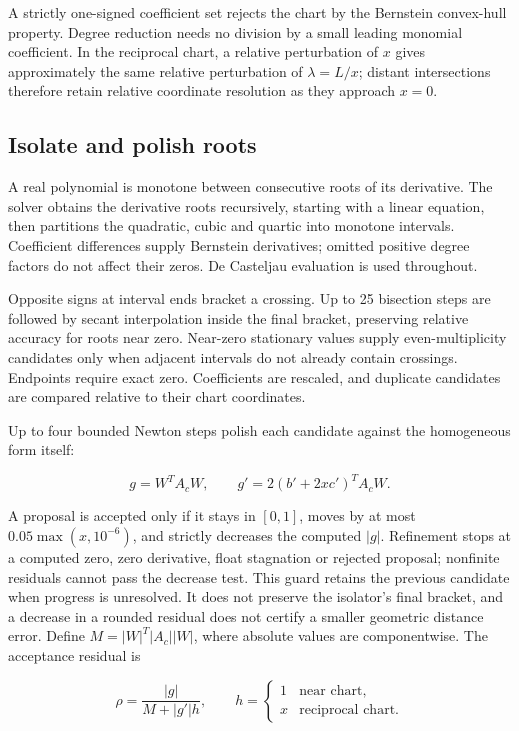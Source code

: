 \documentclass[11pt,a4paper]{article}
\begin{document}
A strictly one-signed coefficient set rejects the chart by the Bernstein
convex-hull property. Degree reduction needs no division by a small
leading monomial coefficient. In the reciprocal chart, a relative
perturbation of \(x\) gives approximately the same relative perturbation
of \(\lambda=L/x\); distant intersections therefore retain relative
coordinate resolution as they approach \(x=0\).

\subsection{Isolate and polish roots}\label{isolate-and-polish-roots}

A real polynomial is monotone between consecutive roots of its
derivative. The solver obtains the derivative roots recursively,
starting with a linear equation, then partitions the quadratic, cubic
and quartic into monotone intervals. Coefficient differences supply
Bernstein derivatives; omitted positive degree factors do not affect
their zeros. De Casteljau evaluation is used throughout.

Opposite signs at interval ends bracket a crossing. Up to 25 bisection
steps are followed by secant interpolation inside the final bracket,
preserving relative accuracy for roots near zero. Near-zero stationary
values supply even-multiplicity candidates only when adjacent intervals
do not already contain crossings. Endpoints require exact zero.
Coefficients are rescaled, and duplicate candidates are compared
relative to their chart coordinates.

Up to four bounded Newton steps polish each candidate against the
homogeneous form itself:

\[
g=W^TA_cW,\qquad g'=2(b'+2xc')^TA_cW.
\]

A proposal is accepted only if it stays in \([0,1]\), moves by at most
\(0.05\max(x,10^{-6})\), and strictly decreases the computed \(|g|\).
Refinement stops at a computed zero, zero derivative, float stagnation
or rejected proposal; nonfinite residuals cannot pass the decrease test.
This guard retains the previous candidate when progress is unresolved.
It does not preserve the isolator's final bracket, and a decrease in a
rounded residual does not certify a smaller geometric distance error.
Define \(M=|W|^T|A_c||W|\), where absolute values are componentwise. The
acceptance residual is

\[
\rho=\frac{|g|}{M+|g'|h},\qquad
h=\begin{cases}1&\text{near chart},\\x&\text{reciprocal chart}.\end{cases}
\]
\end{document}
